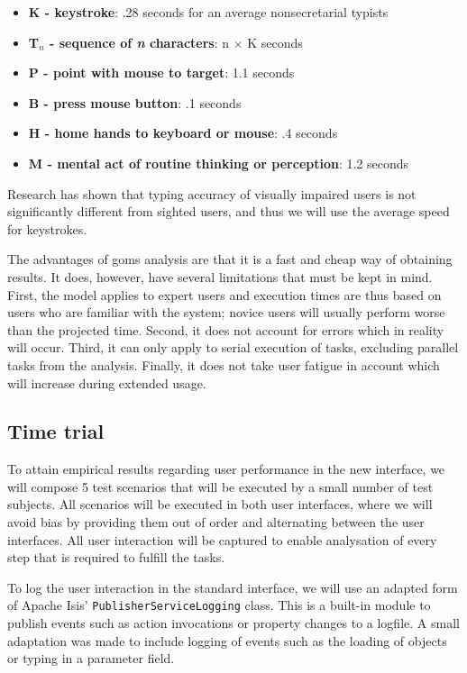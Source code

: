 \begin{itemize}
	\item \textbf{K - keystroke}: .28 seconds for an average nonsecretarial typists
	\item \textbf{T$_n$ - sequence of \textit{n} characters}: n $\times$ K seconds
	\item \textbf{P - point with mouse to target}: 1.1 seconds
	\item \textbf{B - press mouse button}: .1 seconds
	\item \textbf{H - home hands to keyboard or mouse}: .4 seconds
	\item \textbf{M - mental act of routine thinking or perception}: 1.2 seconds
\end{itemize}

Research has shown that typing accuracy of visually impaired users is not significantly different from sighted users\cite{ishida1993accuracy}, and thus we will use the average speed for keystrokes.

The advantages of \acrshort{goms} analysis are that it is a fast and cheap way of obtaining results. It does, however, have several limitations that must be kept in mind\cite{schrepp1990goms}. First, the model applies to expert users and execution times are thus based on users who are familiar with the system; novice users will usually perform worse than the projected time. Second, it does not account for errors which in reality will occur. Third, it can only apply to serial execution of tasks, excluding parallel tasks from the analysis. Finally, it does not take user fatigue in account which will increase during extended usage.

\subsection{Time trial}
\label{subsection:timetrial_methods}
To attain empirical results regarding user performance in the new interface, we will compose 5 test scenarios that will be executed by a small number of test subjects. All scenarios will be executed in both user interfaces, where we will avoid bias by providing them out of order and alternating between the user interfaces\cite{chen2007comparing}. All user interaction will be captured to enable analysation of every step that is required to fulfill the tasks.

To log the user interaction in the standard interface, we will use an adapted form of Apache Isis' \texttt{PublisherServiceLogging} class. This is a built-in module to publish events such as action invocations or property changes to a logfile. A small adaptation was made to include logging of events such as the loading of objects or typing in a parameter field.

